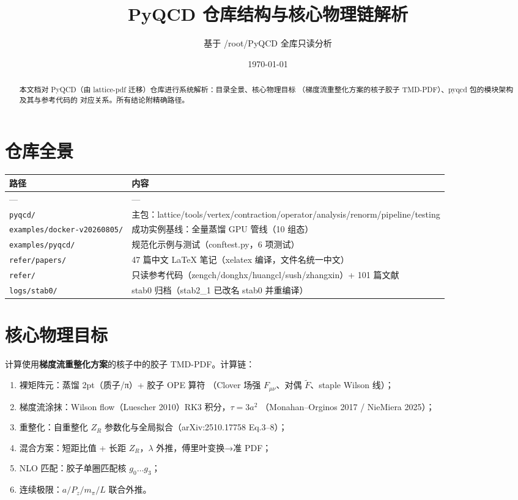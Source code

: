 \documentclass[12pt,a4paper]{ctexart}
\title{\heiti PyQCD 仓库结构与核心物理链解析}
\author{基于 /root/PyQCD 全库只读分析}
\date{\today}
\begin{document}
\maketitle

\begin{abstract}
\noindent
本文档对 PyQCD（由 lattice-pdf 迁移）仓库进行系统解析：目录全景、核心物理目标
（梯度流重整化方案的核子胶子 TMD-PDF）、pyqcd 包的模块架构及其与参考代码的
对应关系。所有结论附精确路径。
\end{abstract}

\section{仓库全景}

\begin{table}[H]
\centering
\begin{tabular}{ll}
\toprule
路径 & 内容 \\
\midrule
--- & --- \\
\texttt{pyqcd/} & 主包：lattice/tools/vertex/contraction/operator/analysis/renorm/pipeline/testing \\
\texttt{examples/docker-v20260805/} & 成功实例基线：全量蒸馏 GPU 管线（10 组态） \\
\texttt{examples/pyqcd/} & 规范化示例与测试（conftest.py，6 项测试） \\
\texttt{refer/papers/} & 47 篇中文 LaTeX 笔记（xelatex 编译，文件名统一中文） \\
\texttt{refer/} & 只读参考代码（zengch/donghx/huangcl/sush/zhangxin）+ 101 篇文献 \\
\texttt{logs/stab0/} & stab0 归档（stab2\_1 已改名 stab0 并重编译） \\
\bottomrule
\end{tabular}
\end{table}
\section{核心物理目标}

计算使用\textbf{梯度流重整化方案}的核子中的胶子 TMD-PDF。计算链：

\begin{enumerate}
  \item 裸矩阵元：蒸馏 2pt（质子/π）+ 胶子 OPE 算符
        （Clover 场强 $F_{\mu\nu}$、对偶 $\tilde F$、staple Wilson 线）；
  \item 梯度流涂抹：Wilson flow（Luescher 2010）RK3 积分，$\tau = 3a^2$
        （Monahan--Orginos 2017 / NieMiera 2025）；
  \item 重整化：自重整化 $Z_R$ 参数化与全局拟合（arXiv:2510.17758 Eq.3--8）；
  \item 混合方案：短距比值 + 长距 $Z_R$，$\lambda$ 外推，傅里叶变换→准 PDF；
  \item NLO 匹配：胶子单圈匹配核 $g_0\ldots g_3$；
  \item 连续极限：$a/P_z/m_\pi/L$ 联合外推。
\end{enumerate}
\end{document}
